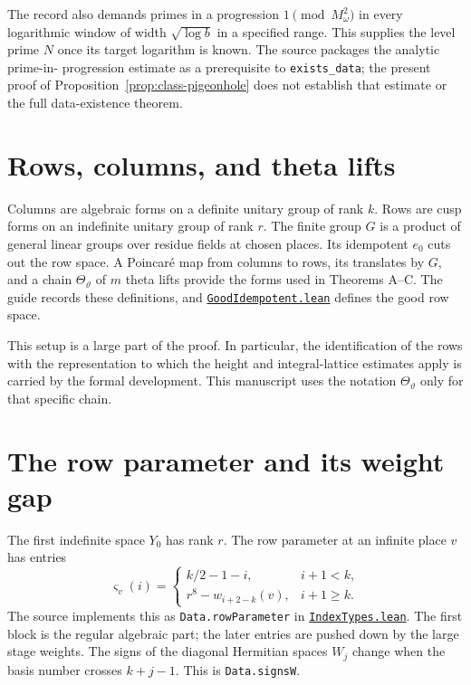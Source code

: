 \documentclass[11pt,oneside,openany]{amsbook}
\theoremstyle{remark}
\numberwithin{equation}{section}
\newcommand{\ghroot}{https://github.com/lsernau/grh-lean/blob/}
\newcommand{\ghrev}{72fead102f663d5c7a407964a13dc0cf9d977207}
\newcommand{\leanfile}[2]{%
  \href{\ghroot\ghrev/grh-compact/src/#1}{\nolinkurl{#2}}}
\begin{document}
The record also demands primes in a progression
$1\pmod{M_\omega^2}$ in every logarithmic window of
width $\sqrt{\log b}$ in a specified range. This
supplies the level prime $N$ once its target logarithm
is known. The source packages the analytic prime-in-
progression estimate as a prerequisite to
\texttt{exists\_data}; the present proof of
Proposition~\ref{prop:class-pigeonhole} does not establish
that estimate or the full data-existence theorem.

\section{Rows, columns, and theta lifts}
\label{sec:spaces}
Columns are algebraic forms on a definite unitary group of rank
$k$. Rows are cusp forms on an indefinite unitary group of rank
$r$. The finite group $G$ is a product of general linear groups
over residue fields at chosen places. Its idempotent $e_0$ cuts
out the row space. A Poincar\'e map from columns to rows,
its translates by $G$, and a chain $\Theta_\vartheta$ of $m$
theta lifts provide the forms used in Theorems A--C. The guide
records these definitions, and
\leanfile{New/Trace/GoodIdempotent.lean}{GoodIdempotent.lean}
defines the good row space.

This setup is a large part of the proof. In particular, the
identification of the rows with the representation to which
the height and integral-lattice estimates apply is carried by
the formal development. This manuscript uses the notation
$\Theta_\vartheta$ only for that specific chain.

\section{The row parameter and its weight gap}
\label{sec:row-parameter}
The first indefinite space $Y_0$ has rank $r$.
The row parameter at an infinite place $v$ has entries
\begin{equation}
\label{eq:row-parameter}
\varsigma_v(i)=
\begin{cases}
 k/2-1-i,&i+1<k,\\
 r^8-w_{i+2-k}(v),&i+1\ge k.
\end{cases}
\end{equation}
The source implements this as \texttt{Data.rowParameter}
in \leanfile{New/Seesaw/IndexTypes.lean}%
{IndexTypes.lean}. The first block is the regular
algebraic part; the later entries are pushed down by
the large stage weights. The signs of the diagonal
Hermitian spaces $W_j$ change when the basis number
crosses $k+j-1$. This is \texttt{Data.signsW}.
\end{document}
